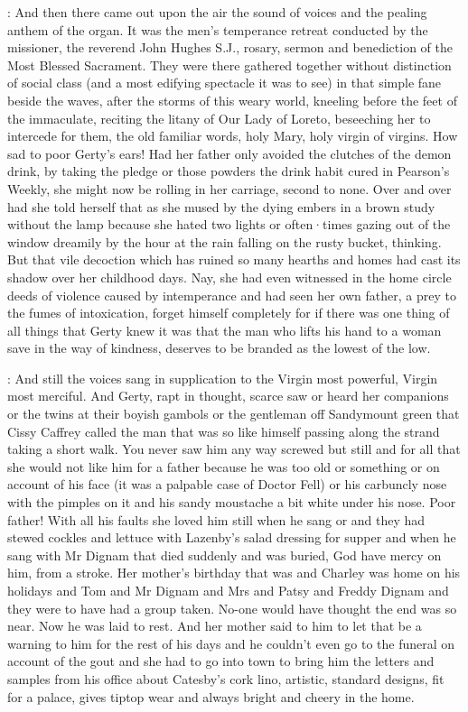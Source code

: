 :
And then
there came out upon the air
the sound of voices
and the pealing anthem of the organ.
It was the men's temperance retreat
conducted by the missioner,
the reverend John Hughes S.J.,
rosary, sermon and benediction
of the Most Blessed Sacrament.
They were there gathered together
without distinction of social class
(and a most edifying spectacle
it was to see)
in that simple fane beside the waves,
after the storms
of this weary world,
kneeling before the feet of the immaculate,
reciting the litany of Our Lady of Loreto,
beseeching her to intercede for them,
the old familiar words,
holy Mary,
holy virgin of virgins.
How sad to poor Gerty's ears!
Had her father
only avoided the clutches of the demon drink,
by taking the pledge
or those powders the drink habit cured
in Pearson's Weekly,
she might now be rolling in her carriage,
second to none.
Over and over
had she told herself that
as she mused by the dying embers
in a brown study
without the lamp
because she hated two lights
or often·times gazing out of the window
dreamily by the hour
at the rain falling on the rusty bucket,
thinking.
But that vile decoction
which has ruined so many hearths and homes
had cast its shadow over her childhood days.
Nay,
she had even witnessed
in the home circle
deeds of violence
caused by intemperance
and had seen her own father,
a prey to the fumes of intoxication,
forget himself completely
for
if there was one thing
of all things
that Gerty knew
it was
that the man who lifts his hand to a woman
save in the way of kindness,
deserves to be branded
as the lowest of the low.

:
And still the voices sang
in supplication to the
Virgin most powerful,
Virgin most merciful.
And Gerty,
rapt in thought,
scarce saw or heard her companions
or the twins at their boyish gambols
or the gentleman off Sandymount green
that Cissy Caffrey called
the man that was so like himself
passing along the strand taking a short walk.
You never saw him any way screwed
but still and for all that
she would not like him for a father
because he was too old or something
or on account of his face
(it was a palpable case of Doctor Fell)
or his carbuncly nose with the pimples on it
and his sandy moustache a bit white under his nose.
Poor father!
With all his faults
she loved him still when he sang
or
and they had stewed cockles
and lettuce with Lazenby's salad dressing for supper
and when he sang
 with Mr Dignam
that died suddenly and was buried,
God
have mercy on him,
from a stroke.
Her mother's birthday that was
and Charley was home on his holidays
and Tom
and Mr Dignam and Mrs
and Patsy and Freddy Dignam
and they were to have had a group taken.
No-one would have thought
the end was so near.
Now he was laid to rest.
And her mother said to him
to let that be a warning to him
for the rest of his days
and he couldn't even go to the funeral
on account of the gout
and she had to go into town
to bring him the letters and samples
from his office
about Catesby's cork lino,
artistic,
standard designs,
fit for a palace,
gives tiptop wear
and always bright and cheery in the home.

